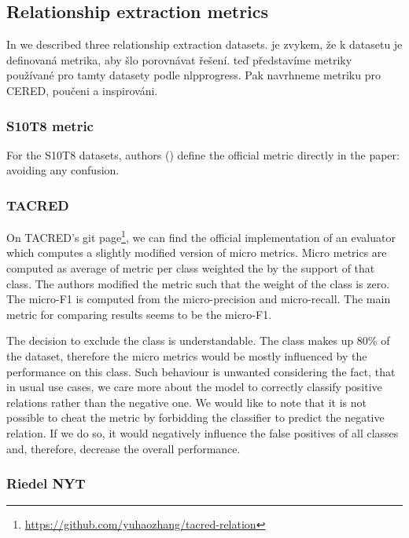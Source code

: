 \subsection{Relationship extraction metrics}

In  we described three relationship extraction datasets. je zvykem, že k datasetu je definovaná metrika, aby šlo porovnávat řešení. teď představíme metriky používané pro tamty datasety podle nlpprogress. Pak navrhneme metriku pro CERED, poučeni a inspirováni.

\subsubsection{S10T8 metric}
For the S10T8 datasets, authors (\cite{semeval}) define the official metric directly in the paper:  avoiding any confusion.

\subsubsection{TACRED}
On TACRED's git page\footnote{\url{https://github.com/yuhaozhang/tacred-relation}}, we can find the official implementation of an evaluator which computes a slightly modified version of micro metrics. Micro metrics are computed as average of metric per class weighted the by the support of that class. The authors modified the metric such that the weight of the  class is zero. The micro-F1 is computed from the micro-precision and micro-recall. The main metric for comparing results seems to be the micro-F1.

The decision to exclude the  class is understandable. The class makes up 80\% of the dataset, therefore the micro metrics would be mostly influenced by the performance on this class. Such behaviour is unwanted considering the fact, that in usual use cases, we care more about the model to correctly classify  positive relations rather than the negative one. We would like to note that it is not possible to cheat the metric by forbidding the classifier to predict the negative relation. If we do so, it would negatively influence the false positives of all classes and, therefore, decrease the overall performance.


\subsubsection{Riedel NYT}



